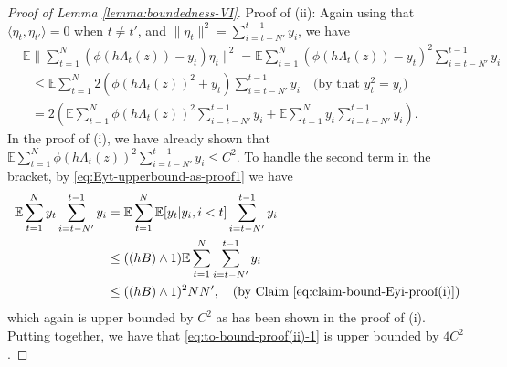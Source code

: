 \documentclass[10pt,a4paper]{amsart}
\newcommand{\E}{\mathbb{E}}
\begin{document}
\begin{proof}[Proof of Lemma \ref{lemma:boundedness-VI}]
\vspace{5pt}
Proof of (ii): 
Again using that $\langle \eta_t, \eta_{t'} \rangle =0$ when $t \neq t'$, 
and $\|\eta_t\|^2 = \sum_{i = t-N'}^{t-1} y_i$,
we have
\begin{align}
&  \E \| \sum_{t=1}^N \left(\phi( h \Lambda_t (z)) - y_t \right) \eta_t \|^2 
=   \E  \sum_{t=1}^N  \left(\phi( h \Lambda_t (z)) - y_t  \right)^2  \sum_{i = t-N'}^{t-1} y_i  \nonumber \\
& ~~~
\le  \E  \sum_{t=1}^N  2 \left( \phi( h \Lambda_t (z))^2 + y_t  \right)  \sum_{i = t-N'}^{t-1} y_i 
	\quad \text{(by that $y_t^2 = y_t$)}  \nonumber \\
& ~~~
= 2 \left(  \E  \sum_{t=1}^N  \phi( h \Lambda_t (z))^2  \sum_{i = t-N'}^{t-1} y_i 
  + 	       \E  \sum_{t=1}^N   y_t  \sum_{i = t-N'}^{t-1} y_i   \right).
   \label{eq:to-bound-proof(ii)-1}
\end{align}
In the proof of (i), we have already shown that $\E  \sum_{t=1}^N  \phi( h \Lambda_t (z))^2  \sum_{i = t-N'}^{t-1} y_i  \le C^2$.
To handle the second term in the bracket,
by \eqref{eq:Eyt-upperbound-as-proof1} we have
\begin{align*}
 \E  \sum_{t=1}^N   y_t  \sum_{i = t-N'}^{t-1} y_i 
&  =  \E  \sum_{t=1}^N   \E [ y_t | y_i, i <t ]   \sum_{i = t-N'}^{t-1} y_i   \\
& \le ( (hB) \wedge 1)  \E  \sum_{t=1}^N   \sum_{i = t-N'}^{t-1} y_i  \\
& \le ( (hB) \wedge 1)^2 N N', 
	\quad \text{(by Claim \eqref{eq:claim-bound-Eyi-proof(i)})} 
\end{align*}
which again is upper bounded by $C^2$ as has been shown in the proof of (i). 
Putting together, we have that \eqref{eq:to-bound-proof(ii)-1} is upper bounded by $4 C^2$.
\end{proof}
\end{document}
